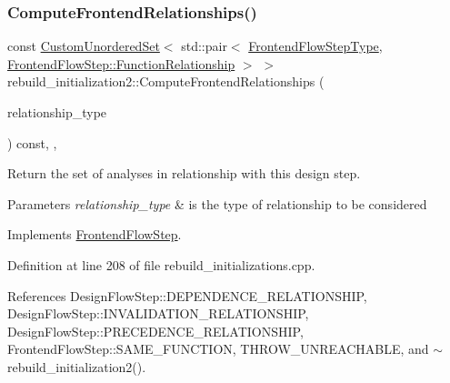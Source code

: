 \subsubsection{\texorpdfstring{Compute\+Frontend\+Relationships()}{ComputeFrontendRelationships()}}
{\footnotesize\ttfamily const \hyperlink{classCustomUnorderedSet}{Custom\+Unordered\+Set}$<$ std\+::pair$<$ \hyperlink{frontend__flow__step_8hpp_afeb3716c693d2b2e4ed3e6d04c3b63bb}{Frontend\+Flow\+Step\+Type}, \hyperlink{classFrontendFlowStep_af7cf30f2023e5b99e637dc2058289ab0}{Frontend\+Flow\+Step\+::\+Function\+Relationship} $>$ $>$ rebuild\+\_\+initialization2\+::\+Compute\+Frontend\+Relationships (\begin{DoxyParamCaption}\item[{const \hyperlink{classDesignFlowStep_a723a3baf19ff2ceb77bc13e099d0b1b7}{Design\+Flow\+Step\+::\+Relationship\+Type}}]{relationship\+\_\+type }\end{DoxyParamCaption}) const\hspace{0.3cm}{\ttfamily [override]}, {\ttfamily [private]}, {\ttfamily [virtual]}}



Return the set of analyses in relationship with this design step. 


\begin{DoxyParams}{Parameters}
{\em relationship\+\_\+type} & is the type of relationship to be considered \\
\hline
\end{DoxyParams}


Implements \hyperlink{classFrontendFlowStep_abeaff70b59734e462d347ed343dd700d}{Frontend\+Flow\+Step}.



Definition at line 208 of file rebuild\+\_\+initializations.\+cpp.



References Design\+Flow\+Step\+::\+D\+E\+P\+E\+N\+D\+E\+N\+C\+E\+\_\+\+R\+E\+L\+A\+T\+I\+O\+N\+S\+H\+IP, Design\+Flow\+Step\+::\+I\+N\+V\+A\+L\+I\+D\+A\+T\+I\+O\+N\+\_\+\+R\+E\+L\+A\+T\+I\+O\+N\+S\+H\+IP, Design\+Flow\+Step\+::\+P\+R\+E\+C\+E\+D\+E\+N\+C\+E\+\_\+\+R\+E\+L\+A\+T\+I\+O\+N\+S\+H\+IP, Frontend\+Flow\+Step\+::\+S\+A\+M\+E\+\_\+\+F\+U\+N\+C\+T\+I\+ON, T\+H\+R\+O\+W\+\_\+\+U\+N\+R\+E\+A\+C\+H\+A\+B\+LE, and $\sim$rebuild\+\_\+initialization2().

